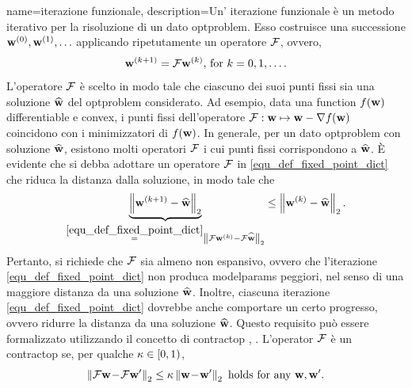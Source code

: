 {name={iterazione funzionale},
	description={Un' iterazione funzionale è un metodo iterativo per la risoluzione 
		di un dato  \gls{optproblem}. Esso costruisce una successione ${\bf w}^{(0)}, {\bf w}^{(1)},\ldots$  
		 applicando ripetutamente un operatore $\mathcal{F}$, ovvero, 
		 \begin{equation} 
		 	\label{equ_def_fixed_point_dict} 
		 	{\bf w}^{(k+1)} = \mathcal{F} {\bf w}^{(k)} \mbox{, for } k=0,1,\ldots.
		 \end{equation} 
		 L'operatore $\mathcal{F}$ è scelto in modo tale che ciascuno dei suoi punti fissi sia una soluzione 
		 $\widehat{{\bf w}}$ del \gls{optproblem} considerato. Ad esempio, data una \gls{function} $f({\bf w})$ 
		 \gls{differentiable} e \gls{convex}, i punti fissi dell'operatore $\mathcal{F}: {\bf w} \mapsto {\bf w} - \nabla f({\bf w})$ 
		 coincidono con i minimizzatori di $f({\bf w})$. In generale, per un dato \gls{optproblem} con soluzione $\widehat{{\bf w}}$, 
		 esistono molti operatori $\mathcal{F}$ i cui punti fissi corrispondono a $\widehat{{\bf w}}$. 
		 È evidente che si debba adottare un operatore $\mathcal{F}$ in \eqref{equ_def_fixed_point_dict} che riduca la distanza dalla soluzione, in modo tale che
		\begin{equation} 
			\nonumber
			\underbrace{\left\Vert { {\bf w}^{(k+1)} - \widehat{\mathbf{w}}} \right\Vert_{2}}_{\stackrel{\eqref{equ_def_fixed_point_dict}}{=} \left\Vert { \mathcal{F}{\bf w}^{(k)} - \mathcal{F}\widehat{{\bf w}}} \right\Vert_{2}}  \leq 	\left\Vert { {\bf w}^{(k)} - \widehat{{\bf w}}} \right\Vert_{2}. 
		\end{equation}
		Pertanto, si richiede che $\mathcal{F}$ sia almeno non espansivo, ovvero che l'iterazione \eqref{equ_def_fixed_point_dict} 
		non produca \gls{modelparams} peggiori, nel senso di una maggiore distanza da una soluzione $\widehat{{\bf w}}$. 
		Inoltre, ciascuna iterazione \eqref{equ_def_fixed_point_dict} dovrebbe anche comportare un certo progresso, 
		ovvero ridurre la distanza da una soluzione $\widehat{{\bf w}}$. Questo requisito può essere formalizzato utilizzando 
		il concetto di \gls{contractop} \cite{Bauschke:2017}, \cite{fixedpoinIsta}. 
		L'operator $\mathcal{F}$ è un \gls{contractop} se, per qualche $\kappa \in [0,1)$,
		\begin{equation} 
			\nonumber
			\normgeneric{ \fixedpointop \weights\!-\!\fixedpointop \weights'}{2}  \leq  \contractfac	\normgeneric{\weights\!-\!\weights'}{2} \mbox{ holds for any } \weights,\weights'.

\end{equation}}}
